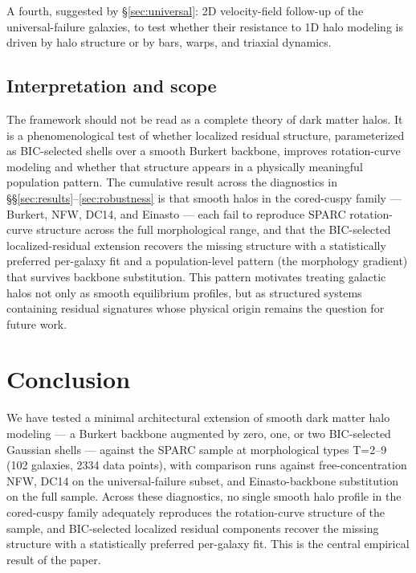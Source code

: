 A fourth, suggested by \S\ref{sec:universal}: 2D velocity-field follow-up of the universal-failure galaxies, to test whether their resistance to 1D halo modeling is driven by halo structure or by bars, warps, and triaxial dynamics.

\subsection{Interpretation and scope}

The framework should not be read as a complete theory of dark matter halos. It is a phenomenological test of whether localized residual structure, parameterized as BIC-selected shells over a smooth Burkert backbone, improves rotation-curve modeling and whether that structure appears in a physically meaningful population pattern. The cumulative result across the diagnostics in \S\S\ref{sec:results}--\ref{sec:robustness} is that smooth halos in the cored-cuspy family --- Burkert, NFW, DC14, and Einasto --- each fail to reproduce SPARC rotation-curve structure across the full morphological range, and that the BIC-selected localized-residual extension recovers the missing structure with a statistically preferred per-galaxy fit and a population-level pattern (the morphology gradient) that survives backbone substitution. This pattern motivates treating galactic halos not only as smooth equilibrium profiles, but as structured systems containing residual signatures whose physical origin remains the question for future work.

\section{Conclusion}
\label{sec:conclusion}

We have tested a minimal architectural extension of smooth dark matter halo modeling --- a Burkert backbone augmented by zero, one, or two BIC-selected Gaussian shells --- against the SPARC sample at morphological types T=2--9 (102 galaxies, 2334 data points), with comparison runs against free-concentration NFW, DC14 on the universal-failure subset, and Einasto-backbone substitution on the full sample. Across these diagnostics, no single smooth halo profile in the cored-cuspy family adequately reproduces the rotation-curve structure of the sample, and BIC-selected localized residual components recover the missing structure with a statistically preferred per-galaxy fit. This is the central empirical result of the paper.

